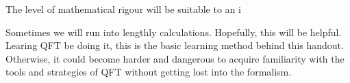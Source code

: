 The level of mathematical rigour will be suitable to an i

Sometimes we will run into 
lengthly calculations.
Hopefully, this will be helpful.
Learing QFT be doing it, this is the basic learning method behind this handout.
Otherwise, it could become harder and dangerous to acquire familiarity
with the tools and strategies of QFT without getting lost into the formalism.




\mySignature{\textsw{\myLocation, \myTime}}{\Large{\calligra\myName}}


